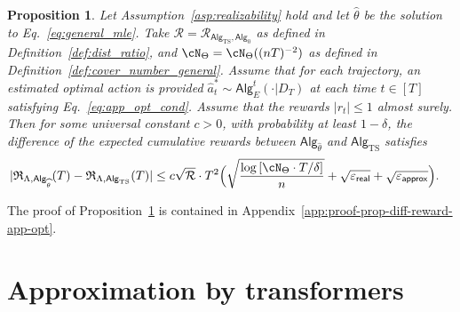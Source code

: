 \documentclass[10pt]{article}
\newtheorem{proposition}[theorem]{Proposition}
\renewcommand{\epsilon}{\varepsilon}
\newcommand{\eps}{\varepsilon}
\newcommand{\<}{\left\langle}
\renewcommand{\>}{\right\rangle}
\newcommand{\paren}[1]{{\left( #1 \right)}}
\newcommand{\brac}[1]{{\left[ #1 \right]}}
\newcommand{\E}{\mathbb{E}}
\renewcommand{\P}{\mathbb{P}}
\newcommand{\HelD}{{\mathrm{D}_{\mathrm{H}}}}
\newcommand{\TS}{{\mathrm{TS}}}
\newcommand{\state}{{s}}
\newcommand{\action}{{a}}
\newcommand{\reward}{{r}}
\newcommand{\totlen}{{T}} %
\newcommand{\sAlg}{{\mathsf{Alg}}}
\newcommand{\dset}{{D}}
\newcommand{\Numobs}{{n}}   %
\newcommand{\Par}{{\theta}}
\newcommand{\Parspace}{{\Theta}}
\newcommand{\appeps}{\eps_{{\mathsf{approx}}}}
\newcommand{\EstPar}{{\widehat{\theta}}}
\newcommand{\prior}{{\Lambda}}
\newcommand{\shortexp}{{E}}
\newcommand{\geneps}{{\epsilon}_{\sf real}}
\newcommand{\totreward}{{\mathfrak{R}}}  %
\newcommand{\distratio}{{\mathcal{R}}}
\begin{document}
\begin{proposition}\label{prop:app_opt_diff_reward} Let Assumption~\ref{asp:realizability} hold and let $\EstPar$ be the solution to Eq.~\eqref{eq:general_mle}. Take $\distratio = \distratio_{\sAlg_\TS,\sAlg_0}$ as defined in Definition~\ref{def:dist_ratio}, and $\cN_{\Parspace} = \cN_{\Parspace}((\Numobs\totlen)^{-2})$  as defined in Definition~\ref{def:cover_number_general}. Assume that for each trajectory, an estimated optimal action is provided $\widehat\action_t^* \sim \sAlg_{\shortexp}^t(\cdot | \dset_\totlen)$ at each time $t\in[\totlen]$ satisfying Eq.~\eqref{eq:app_opt_cond}. 
Assume that the rewards $|\reward_t|\leq 1$  almost surely. Then for some universal constant $c>0$, with probability at least $1-\delta$, the difference of the expected cumulative rewards between $\sAlg_\EstPar$ and $\sAlg_\TS$ satisfies 
\begin{align*}
|\totreward_{\prior,\sAlg_\EstPar}(\totlen)-\totreward_{\prior,\sAlg_\TS}(\totlen)|
&\leq 
c \sqrt{\distratio}\cdot\totlen^2 \Big( \sqrt{\frac{\log \brac{ \cN_{\Parspace} \cdot \totlen/\delta } }{n} } + \sqrt{\geneps} + \sqrt{\appeps} \Big). 
\end{align*}
\end{proposition}
The proof of Proposition~\ref{prop:app_opt_diff_reward} is contained in Appendix~\ref{app:proof-prop-diff-reward-app-opt}. 






\section{Approximation by transformers}\label{sec:ICRL}
\end{document}
